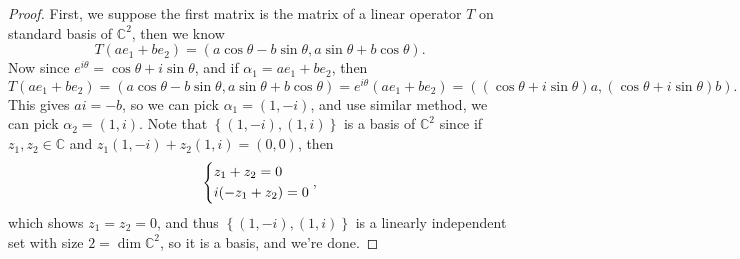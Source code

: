 \begin{proof}
    First, we suppose the first matrix is the matrix of a linear operator \(T\) on standard basis of \(\mathbb{C} ^2\), then we know 
    \[
        T(ae_1 + be_2) = (a \cos \theta - b \sin \theta , a \sin \theta + b \cos \theta ).
    \] Now since \(e^{i \theta } = \cos \theta + i \sin \theta \), and if \(\alpha _1 = ae_1 + be_2\), then 
    \[
        T(a e_1 + b e_2) = (a \cos \theta - b \sin \theta , a \sin \theta + b \cos \theta ) = e^{i \theta }(ae_1 + b e_2) = ((\cos \theta + i \sin \theta )a, (\cos \theta + i \sin \theta )b).
    \]  This gives \(ai = -b\), so we can pick \(\alpha _1 = (1, -i)\), and use similar method, we can pick \(\alpha _2 = (1, i)\). Note that \(\left\{ (1, -i), (1, i) \right\} \) is a basis of \(\mathbb{C} ^2\) since if \(z_1, z_2 \in \mathbb{C} \) and \(z_1 (1, -i) + z_2 (1, i) = (0, 0)\), then 
    \[
        \begin{dcases}
            z_1 + z_2 = 0 \\
            i(-z_1 + z_2) = 0
        \end{dcases},
    \] which shows \(z_1 = z_2 = 0\), and thus \(\left\{ (1, -i), (1, i) \right\} \) is a linearly independent set with size \(2 = \dim \mathbb{C} ^2\), so it is a basis, and we're done.    
\end{proof}

